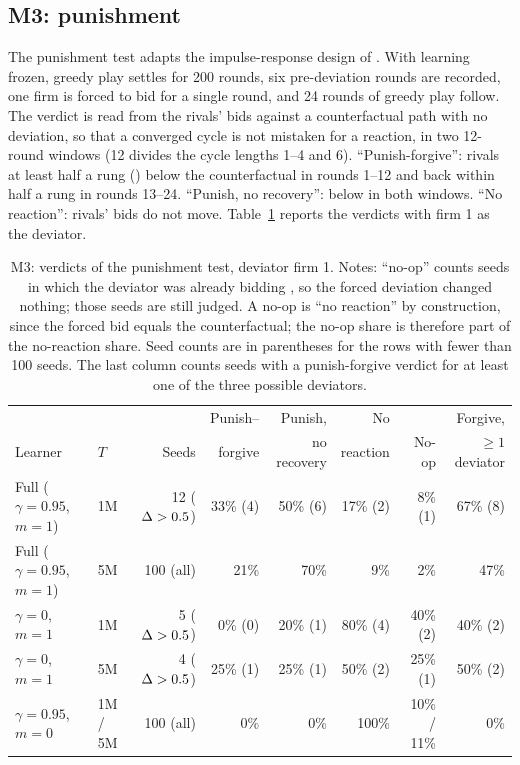 \subsection{M3: punishment}

The punishment test adapts the impulse-response design of \citet{calvano2020}. With learning frozen, greedy play settles for 200 rounds, six pre-deviation rounds are recorded, one firm is forced to bid  for a single round, and 24 rounds of greedy play follow. The verdict is read from the rivals' bids against a counterfactual path with no deviation, so that a converged cycle is not mistaken for a reaction, in two 12-round windows (12 divides the cycle lengths 1--4 and 6). ``Punish-forgive'': rivals at least half a rung () below the counterfactual in rounds 1--12 and back within half a rung in rounds 13--24. ``Punish, no recovery'': below in both windows. ``No reaction'': rivals' bids do not move. Table~\ref{tab:m3} reports the verdicts with firm 1 as the deviator.

\begin{table}[htbp]
\centering
\caption{M3: verdicts of the punishment test, deviator firm 1. Notes: ``no-op'' counts seeds in which the deviator was already bidding , so the forced deviation changed nothing; those seeds are still judged. A no-op is ``no reaction'' by construction, since the forced bid equals the counterfactual; the no-op share is therefore part of the no-reaction share. Seed counts are in parentheses for the rows with fewer than 100 seeds. The last column counts seeds with a punish-forgive verdict for at least one of the three possible deviators.}
\label{tab:m3}
\footnotesize
\setlength{\tabcolsep}{3pt}
\begin{tabular}{@{}llrrrrrr@{}}
\toprule
 & & & Punish-- & Punish, & No & & Forgive, \\
Learner & $T$ & Seeds & forgive & no recovery & reaction & No-op & $\geq 1$ deviator \\
\midrule
Full ($\gamma=0.95$, $m=1$) & 1M & 12 ($\Delta>0.5$) & 33\% (4) & 50\% (6) & 17\% (2) & 8\% (1) & 67\% (8) \\
Full ($\gamma=0.95$, $m=1$) & 5M & 100 (all) & 21\% & 70\% & 9\% & 2\% & 47\% \\
$\gamma=0$, $m=1$ & 1M & 5 ($\Delta>0.5$) & 0\% (0) & 20\% (1) & 80\% (4) & 40\% (2) & 40\% (2) \\
$\gamma=0$, $m=1$ & 5M & 4 ($\Delta>0.5$) & 25\% (1) & 25\% (1) & 50\% (2) & 25\% (1) & 50\% (2) \\
$\gamma=0.95$, $m=0$ & 1M / 5M & 100 (all) & 0\% & 0\% & 100\% & 10\% / 11\% & 0\% \\
\bottomrule
\end{tabular}
\end{table}

